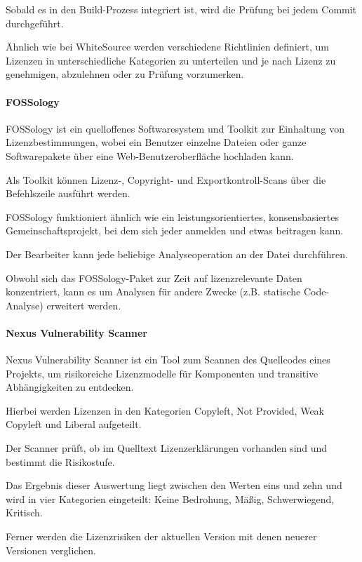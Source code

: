Sobald es in den Build-Prozess integriert ist, wird die Prüfung bei jedem Commit durchgeführt. 

Ähnlich wie bei WhiteSource werden verschiedene Richtlinien definiert, um Lizenzen in unterschiedliche Kategorien zu unterteilen und je nach Lizenz zu genehmigen, abzulehnen oder zu Prüfung vorzumerken. 

\paragraph{FOSSology}

FOSSology ist ein quelloffenes Softwaresystem und Toolkit zur Einhaltung von Lizenzbestimmungen, wobei ein Benutzer einzelne Dateien oder ganze Softwarepakete über eine Web-Benutzeroberfläche hochladen kann. \cite{fossology_workgroup_fossology_2017} 

Als Toolkit können Lizenz-, Copyright- und Exportkontroll-Scans über die Befehlszeile ausführt werden.

FOSSology funktioniert ähnlich wie ein leistungsorientiertes, konsensbasiertes Gemeinschaftsprojekt, bei dem sich jeder anmelden und etwas beitragen kann. 

Der Bearbeiter kann jede beliebige Analyseoperation an der Datei durchführen. 

Obwohl sich das FOSSology-Paket zur Zeit auf lizenzrelevante Daten konzentriert, kann es um Analysen für andere Zwecke (z.B. statische Code-Analyse) erweitert werden.

\paragraph{Nexus Vulnerability Scanner}

Nexus Vulnerability Scanner ist ein Tool zum Scannen des Quellcodes eines Projekts, um risikoreiche Lizenzmodelle für Komponenten und transitive Abhängigkeiten zu entdecken. \cite{sonatype_nexus_2008} 

Hierbei werden Lizenzen in den Kategorien Copyleft, Not Provided, Weak Copyleft und Liberal aufgeteilt. 

Der Scanner prüft, ob im Quelltext Lizenzerklärungen vorhanden sind und bestimmt die Risikostufe. 

Das Ergebnis dieser Auswertung liegt zwischen den Werten eins und zehn und wird in vier Kategorien eingeteilt: Keine Bedrohung, Mäßig, Schwerwiegend, Kritisch. \cite{sonatype_guide_nodate} 

Ferner werden die Lizenzrisiken der aktuellen Version mit denen neuerer Versionen verglichen. 

